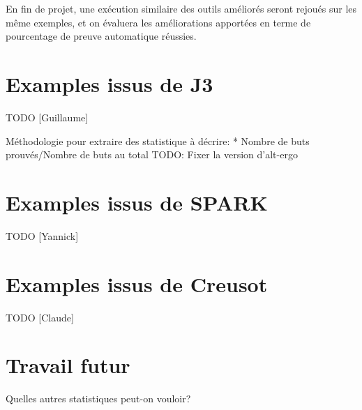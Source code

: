 \documentclass[a4paper,11pt]{article}
\begin{document}
En fin de projet, une exécution similaire des outils améliorés seront
rejoués sur les même exemples, et on évaluera les améliorations
apportées en terme de pourcentage de preuve automatique réussies.


\section{Examples issus de J3}

TODO [Guillaume]

Méthodologie pour extraire des statistique à décrire:
* Nombre de buts prouvés/Nombre de buts au total
TODO: Fixer la version d'alt-ergo

\section{Examples issus de SPARK}

TODO [Yannick]

\section{Examples issus de Creusot}

TODO [Claude]

\section{Travail futur}

Quelles autres statistiques peut-on vouloir?
\end{document}

